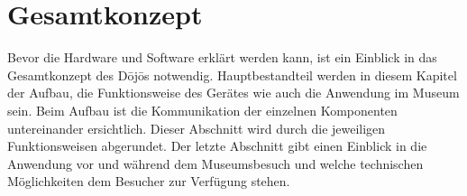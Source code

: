 \section{Gesamtkonzept}\label{sec:gesamtkonzept}
Bevor die Hardware und Software erklärt werden kann, ist ein Einblick in das Gesamtkonzept des Dōjōs notwendig. Hauptbestandteil werden in diesem Kapitel der Aufbau, die Funktionsweise des Gerätes wie auch die Anwendung im Museum sein. Beim Aufbau ist die Kommunikation der einzelnen Komponenten untereinander ersichtlich. Dieser Abschnitt wird durch die jeweiligen Funktionsweisen abgerundet. Der letzte Abschnitt gibt einen Einblick in die Anwendung vor und während dem Museumsbesuch und welche technischen Möglichkeiten dem Besucher zur Verfügung stehen.